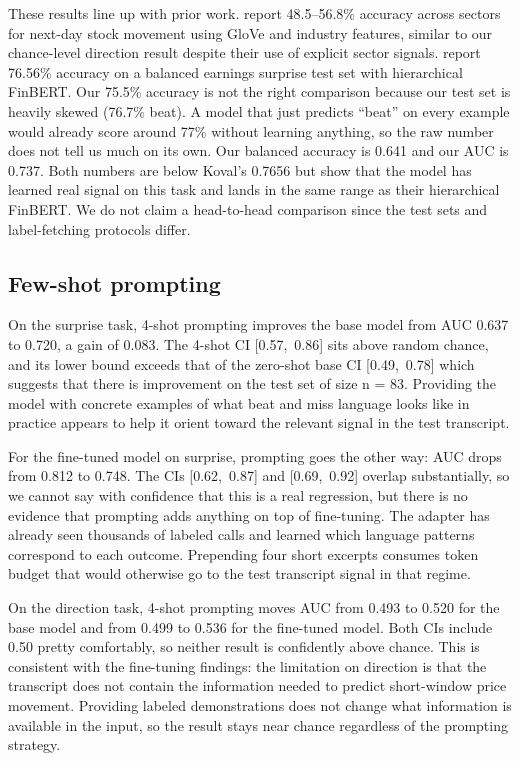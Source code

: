 \documentclass[11pt]{article}
\begin{document}
These results line up with prior work.
\citet{Ma2020} report 48.5--56.8\% accuracy across sectors for
next-day stock movement using GloVe and industry features, similar
to our chance-level direction result despite their use of explicit
sector signals. \citet{Koval2023} report 76.56\% accuracy on a
balanced earnings surprise test set with hierarchical FinBERT.
Our 75.5\% accuracy is not the right comparison because our test
set is heavily skewed (76.7\% beat). A model that just predicts
``beat'' on every example would already score around 77\% without
learning anything, so the raw number does not tell us much on its
own. Our balanced accuracy is 0.641 and our
AUC is 0.737. Both numbers are below Koval's 0.7656 but show that
the model has learned real signal on this task and lands in the
same range as their hierarchical FinBERT. We do not claim a
head-to-head comparison since the test sets and label-fetching
protocols differ.

\subsection{Few-shot prompting}

On the surprise task, 4-shot prompting improves the base model from AUC 0.637 to 0.720, a gain of 0.083. The 4-shot CI \mbox{[0.57, 0.86]} sits above random chance, and its lower bound exceeds that of the zero-shot base CI \mbox{[0.49, 0.78]} which suggests that there is improvement on the test set of size n = 83. Providing the model with concrete examples of what beat and miss language looks like in practice appears to help it orient toward the relevant signal in the test transcript.

For the fine-tuned model on surprise, prompting goes the other way: AUC drops from 0.812 to 0.748. The CIs \mbox{[0.62, 0.87]} and \mbox{[0.69, 0.92]} overlap substantially, so we cannot say with confidence that this is a real regression, but there is no evidence that prompting adds anything on top of fine-tuning. The adapter has already seen thousands of labeled calls and learned which language patterns correspond to each outcome. Prepending four short excerpts consumes token budget that would otherwise go to the test transcript signal in that regime.

On the direction task, 4-shot prompting moves AUC from 0.493 to 0.520 for the base model and from 0.499 to 0.536 for the fine-tuned model. Both CIs include 0.50 pretty comfortably, so neither result is confidently above chance. This is consistent with the fine-tuning findings: the limitation on direction is that the transcript does not contain the information needed to predict short-window price movement. Providing labeled demonstrations does not change what information is available in the input, so the result stays near chance regardless of the prompting strategy.
\end{document}
